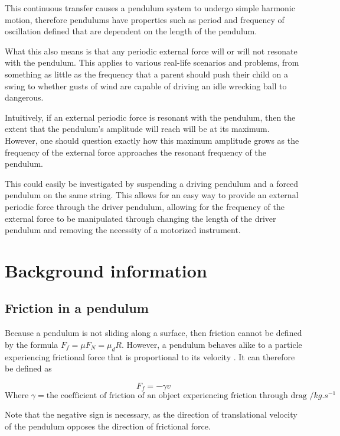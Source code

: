 \documentclass[letterpaper, 12pt]{article}
\begin{document}
This continuous transfer causes
a pendulum system to undergo simple harmonic motion,
therefore pendulums have properties such as
period and frequency of oscillation defined
that are dependent on the length of the pendulum.

What this also means is that any periodic
external force will or will not resonate with
the pendulum. This applies to various real-life
scenarios and problems, from something as little
as the frequency that a parent should push
their child on a swing to whether gusts
of wind are capable of driving an idle wrecking ball
to dangerous.

Intuitively, if an external periodic force
is resonant with the pendulum, then the extent
that the pendulum's amplitude will reach
will be at its maximum. However, one should question exactly
how this maximum amplitude grows as the frequency
of the external force approaches the resonant frequency
of the pendulum.

This could easily be investigated by suspending
a driving pendulum and a forced pendulum on
the same string. This allows for an easy way
to provide an external periodic force through
the driver pendulum, allowing for the frequency
of the external force to be manipulated through
changing the length of the driver pendulum and
removing the necessity of a motorized
instrument.

\section{Background information} \label{sec:bgInfo}

\subsection{Friction in a pendulum}

Because a pendulum is not sliding along a surface,
then friction cannot be defined by the formula
\(F_f = \mu F_N = \mu_d R\). However, a pendulum
behaves alike to a particle experiencing frictional force
that is proportional to its velocity \cite{FrictionalForceProportional2021}.
It can therefore be defined as

\begin{equation} \label{eq:frictionVelocity}
    F_f = -\gamma v
\end{equation}
\[
    \text{Where } \gamma = \text{the coefficient of friction of an object experiencing friction through drag } /\unit{kg.s^{-1}}
\]

Note that the negative sign is necessary, as the direction
of translational velocity of the pendulum
opposes the direction of frictional force.
\end{document}
